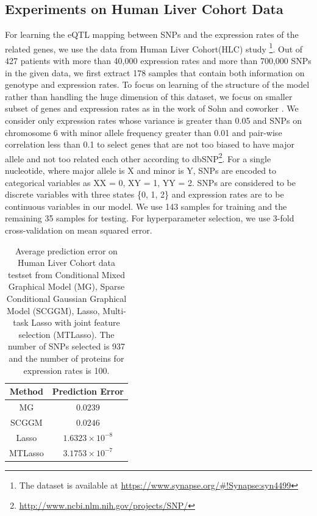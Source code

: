 \documentclass{article}
\begin{document}
\subsection{Experiments on Human Liver Cohort Data}
For learning the eQTL mapping between SNPs and the expression rates of the related genes, we use the data from Human Liver Cohort(HLC) study \cite{schadt2008mapping} \footnote{The dataset is available at \url{ https://www.synapse.org/\#!Synapse:syn4499}}. Out of 427 patients with more than 40,000 expression rates and more than 700,000 SNPs in the given data, we first extract 178 samples that contain both information on genotype and expression rates. To focus on learning of the structure of the model rather than handling the huge dimension of this dataset, we focus on smaller subset of genes and expression rates as in the work of Sohn and coworker \cite{sohn2012joint}. We consider only expression rates whose variance is greater than 0.05 and SNPs on chromosome 6 with minor allele frequency greater than 0.01 and pair-wise correlation less than 0.1 to select genes that are not too biased to have major allele and not too related each other according to dbSNP\footnote{\url{http://www.ncbi.nlm.nih.gov/projects/SNP/}}. For a single nucleotide, where major allele is X and minor is Y, SNPs are encoded to categorical variables as XX = 0, XY = 1, YY = 2. SNPs are considered to be discrete variables with three states \{0, 1, 2\} and expression rates are to be continuous variables in our model. We use 143 samples for training and the remaining 35 samples for testing. For hyperparameter selection, we use 3-fold cross-validation on mean squared error.


\begin{table}
\begin{center}
    \begin{tabular}{| c | c |}
    \hline
    Method & Prediction Error \\
    \hline
    MG & $0.0239$ \\
    SCGGM & $0.0246$  \\
    Lasso & $1.6323 \times 10^{-8}$  \\
    MTLasso & $3.1753 \times 10^{-7}$ \\
    \hline 
    \end{tabular}
\end{center}
\caption{Average prediction error on Human Liver Cohort data testset from Conditional Mixed Graphical Model (MG), Sparse Conditional Gaussian Graphical Model (SCGGM), Lasso, Multi-task Lasso with joint feature selection (MTLasso). The number of SNPs selected is 937 and the number of proteins for expression rates is 100.}
\label{table:real_large}
\end{table}
\end{document}

